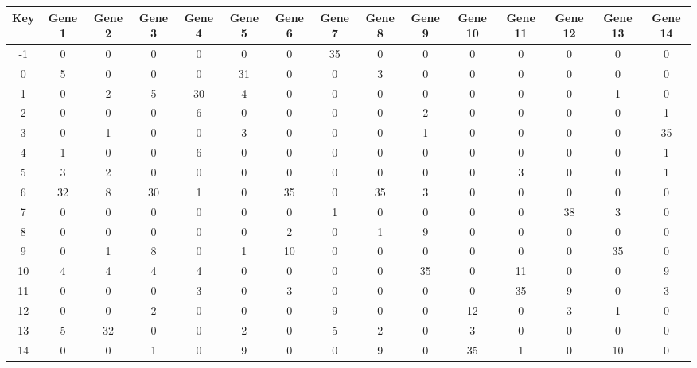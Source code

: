 \begin{tabular}{|c|c|c|c|c|c|c|c|c|c|c|c|c|c|c|}
\hline
Key & Gene 1 & Gene 2 & Gene 3 & Gene 4 & Gene 5 & Gene 6 & Gene 7 & Gene 8 & Gene 9 & Gene 10 & Gene 11 & Gene 12 & Gene 13 & Gene 14 \\
\hline
-1 & 0 & 0 & 0 & 0 & 0 & 0 & 35 & 0 & 0 & 0 & 0 & 0 & 0 & 0 \\
0 & 5 & 0 & 0 & 0 & 31 & 0 & 0 & 3 & 0 & 0 & 0 & 0 & 0 & 0 \\
1 & 0 & 2 & 5 & 30 & 4 & 0 & 0 & 0 & 0 & 0 & 0 & 0 & 1 & 0 \\
2 & 0 & 0 & 0 & 6 & 0 & 0 & 0 & 0 & 2 & 0 & 0 & 0 & 0 & 1 \\
3 & 0 & 1 & 0 & 0 & 3 & 0 & 0 & 0 & 1 & 0 & 0 & 0 & 0 & 35 \\
4 & 1 & 0 & 0 & 6 & 0 & 0 & 0 & 0 & 0 & 0 & 0 & 0 & 0 & 1 \\
5 & 3 & 2 & 0 & 0 & 0 & 0 & 0 & 0 & 0 & 0 & 3 & 0 & 0 & 1 \\
6 & 32 & 8 & 30 & 1 & 0 & 35 & 0 & 35 & 3 & 0 & 0 & 0 & 0 & 0 \\
7 & 0 & 0 & 0 & 0 & 0 & 0 & 1 & 0 & 0 & 0 & 0 & 38 & 3 & 0 \\
8 & 0 & 0 & 0 & 0 & 0 & 2 & 0 & 1 & 9 & 0 & 0 & 0 & 0 & 0 \\
9 & 0 & 1 & 8 & 0 & 1 & 10 & 0 & 0 & 0 & 0 & 0 & 0 & 35 & 0 \\
10 & 4 & 4 & 4 & 4 & 0 & 0 & 0 & 0 & 35 & 0 & 11 & 0 & 0 & 9 \\
11 & 0 & 0 & 0 & 3 & 0 & 3 & 0 & 0 & 0 & 0 & 35 & 9 & 0 & 3 \\
12 & 0 & 0 & 2 & 0 & 0 & 0 & 9 & 0 & 0 & 12 & 0 & 3 & 1 & 0 \\
13 & 5 & 32 & 0 & 0 & 2 & 0 & 5 & 2 & 0 & 3 & 0 & 0 & 0 & 0 \\
14 & 0 & 0 & 1 & 0 & 9 & 0 & 0 & 9 & 0 & 35 & 1 & 0 & 10 & 0 \\
\hline
\end{tabular}
